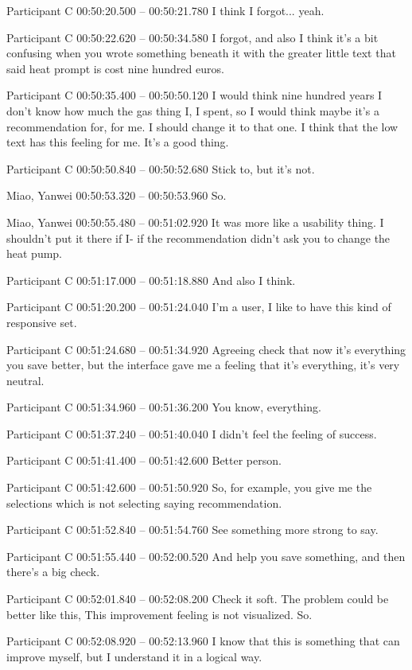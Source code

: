 {Participant C 00:50:20.500 -- 00:50:21.780
I think I forgot... yeah.

Participant C 00:50:22.620 -- 00:50:34.580
I forgot, and also I think it's a bit confusing when you wrote something beneath it with the greater little text that said heat prompt is cost nine hundred euros.

Participant C 00:50:35.400 -- 00:50:50.120
I would think nine hundred years I don't know how much the gas thing I, I spent, so I would think maybe it's a recommendation for, for me. I should change it to that one. I think that the low text has this feeling for me. It's a good thing.

Participant C 00:50:50.840 -- 00:50:52.680
Stick to, but it's not.

Miao, Yanwei 00:50:53.320 -- 00:50:53.960
So.

Miao, Yanwei 00:50:55.480 -- 00:51:02.920
It was more like a usability thing. I shouldn't put it there if I- if the recommendation didn't ask you to change the heat pump.

Participant C 00:51:17.000 -- 00:51:18.880
And also I think.

Participant C 00:51:20.200 -- 00:51:24.040
I'm a user, I like to have this kind of responsive set.

Participant C 00:51:24.680 -- 00:51:34.920
Agreeing check that now it's everything you save better, but the interface gave me a feeling that it's everything, it's very neutral.

Participant C 00:51:34.960 -- 00:51:36.200
You know, everything.

Participant C 00:51:37.240 -- 00:51:40.040
I didn't feel the feeling of success.

Participant C 00:51:41.400 -- 00:51:42.600
Better person.

Participant C 00:51:42.600 -- 00:51:50.920
So, for example, you give me the selections which is not selecting saying recommendation.

Participant C 00:51:52.840 -- 00:51:54.760
See something more strong to say.

Participant C 00:51:55.440 -- 00:52:00.520
And help you save something, and then there's a big check.

Participant C 00:52:01.840 -- 00:52:08.200
Check it soft. The problem could be better like this, This improvement feeling is not visualized. So.

Participant C 00:52:08.920 -- 00:52:13.960
I know that this is something that can improve myself, but I understand it in a logical way.

}

